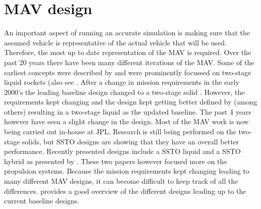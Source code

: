 \section{\ac{MAV} design}
\label{sec:mavDesign}
An important aspect of running an accurate simulation is making sure that the assumed vehicle is representative of the actual vehicle that will be used. Therefore, the most up to date representation of the \ac{MAV} is required. Over the past 20 years there have been many different iterations of the \ac{MAV}. Some of the earliest concepts were described by \cite{whitehead1997,guernsey1998,desai1998,stone1999} and were prominently focussed on two-stage liquid rockets (also see . After a change in mission requirements in the early 2000's the leading baseline design changed to a two-stage solid \citep{stephenson2002,whitehead2005,stephenson2006}. However, the requirements kept changing and the design kept getting better defined by (among others) \cite{sengupta2012,trinidad2012,mungas2012,mppg2012} resulting in a two-stage liquid as the updated baseline. The past 4 years however have seen a slight change in the design. Most of the \ac{MAV} work is now being carried out in-house at \ac{JPL}. Research is still being performed on the two-stage solids, but \ac{SSTO} designs are showing that they have an overall better performance. Recently presented designs include a \ac{SSTO} liquid \citep{vaughan2016technology} and a \ac{SSTO} hybrid as presented by \citep{karp2016technology}. These two papers however focused more on the propulsion systems. Because the mission requirements kept changing leading to many different \ac{MAV} designs, it can become difficult to keep track of all the differences. \cite{shotwell2016history} provides a good overview of the different designs leading up to the current baseline designs. \\


